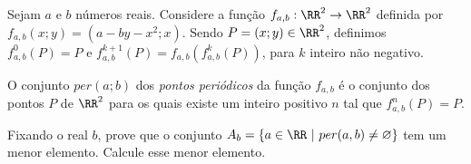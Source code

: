 Sejam $a$ e $b$ números reais. Considere a função $f_{a,b}: \RR^2 \to \RR^2$ definida por $f_{a,b}(x;y) = (a-by-x^2;x)$. Sendo $P = (x;y) \in \RR^2$, definimos $f_{a,b}^0(P) = P$ e $f_{a,b}^{k+1}(P) = f_{a,b}(f_{a,b}^{k}(P))$, para $k$ inteiro não negativo.

O conjunto $per(a;b)$ dos \textit{pontos periódicos} da função $f_{a,b}$ é o conjunto dos pontos $P$ de $\RR^2$ para os quais existe um inteiro positivo $n$ tal que $f_{a,b}^n(P) = P$.

Fixando o real $b$, prove que o conjunto $A_b = \{a \in \RR\ |\ per(a,b) \neq \varnothing \}$ tem um menor elemento. Calcule esse menor elemento.